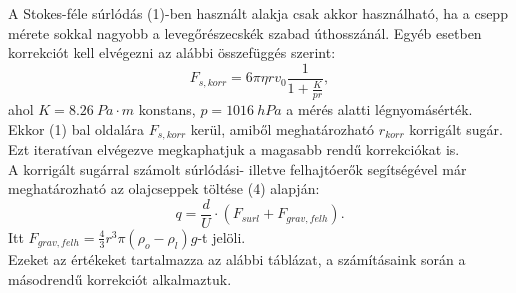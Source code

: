 \documentclass[a4paper]{article}
\begin{document}
A Stokes-féle súrlódás (1)-ben használt alakja csak akkor használható, ha a csepp mérete sokkal nagyobb a levegőrészecskék szabad úthosszánál. Egyéb esetben korrekciót kell elvégezni az alábbi összefüggés szerint:
\begin{equation}
F_{s,korr}=6\pi\eta r v_0\frac{1}{1+\frac{K}{pr}},
\end{equation} 
ahol $K=8.26\ Pa\cdot m$ konstans, $p=1016\ hPa$ a mérés alatti légnyomásérték.\\
Ekkor (1) bal oldalára $F_{s,korr}$ kerül, amiből meghatározható $r_{korr}$ korrigált sugár. Ezt iteratívan elvégezve megkaphatjuk a magasabb rendű korrekciókat is.\\
A korrigált sugárral számolt súrlódási- illetve felhajtóerők segítségével már meghatározható az olajcseppek töltése (4) alapján:
\begin{equation}
q=\frac{d}{U}\cdot(F_{surl}+F_{grav,felh}).
\end{equation}
Itt $F_{grav,felh}=\frac{4}{3}r^3\pi(\rho_o-\rho_l)g$-t jelöli.\\
Ezeket az értékeket tartalmazza az alábbi táblázat, a számításaink során a másodrendű korrekciót alkalmaztuk.\newpage
\end{document}
